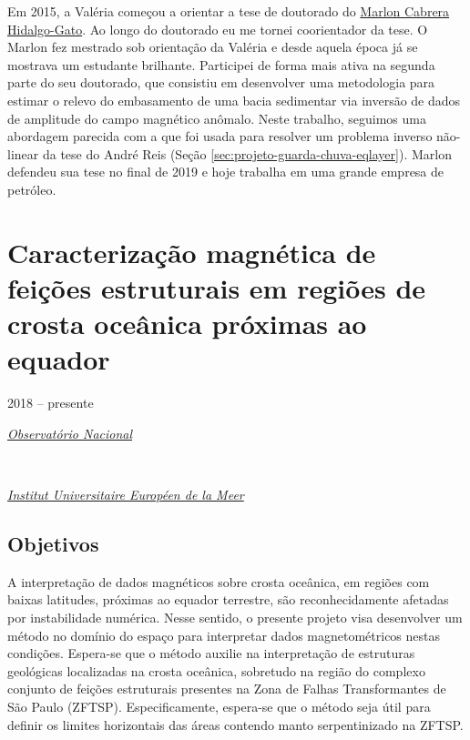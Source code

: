 \bigskip

\noindent Em 2015, a Valéria começou a orientar a tese de doutorado do
\href{https://lattes.cnpq.br/4057248251995225}{Marlon Cabrera Hidalgo-Gato}.
Ao longo do doutorado eu me tornei coorientador da tese.
O Marlon fez mestrado sob orientação da Valéria e desde aquela época já se
mostrava um estudante brilhante. Participei de forma mais ativa na segunda parte do
seu doutorado, que consistiu em desenvolver uma metodologia para estimar o 
relevo do embasamento de uma bacia sedimentar via inversão de dados de amplitude
do campo magnético anômalo. Neste trabalho, seguimos uma abordagem parecida com a
que foi usada para resolver um problema inverso não-linear da tese do André Reis
(Seção \ref{sec:projeto-guarda-chuva-eqlayer}). Marlon defendeu sua tese no final 
de 2019 e hoje trabalha em uma grande empresa de petróleo.

\section{Caracterização magnética de feições estruturais em regiões de crosta oceânica próximas ao equador} 
\label{sec:projeto-baixas-latitudes}

2018 -- presente
\vspace{0.3\baselineskip}\\
\noindent\parbox{0.03\textwidth}{\vspace{-0.2\baselineskip}\faUniversity} \href{https://www.gov.br/observatorio/pt-br}{\textsl{Observatório Nacional}}
\parbox{0.03\textwidth}{\vspace{-0.2\baselineskip} \hfill {}} \\
\noindent\parbox{0.03\textwidth}{\vspace{-0.2\baselineskip}\faUniversity}
\href{https://www-iuem.univ-brest.fr/}{\textsl{Institut Universitaire Européen de la Meer}}
\parbox{0.03\textwidth}{\vspace{-0.2\baselineskip} \hfill {}}

\subsection*{Objetivos}

A interpretação de dados magnéticos sobre crosta oceânica, em regiões com baixas latitudes,
próximas ao equador terrestre, são reconhecidamente afetadas por instabilidade numérica.
Nesse sentido, o presente projeto visa desenvolver um método no domínio do espaço 
para interpretar dados magnetométricos nestas condições. 
Espera-se que o método auxilie na interpretação de estruturas geológicas localizadas na
crosta oceânica, sobretudo na região do complexo conjunto de feições estruturais presentes
na Zona de Falhas Transformantes de São Paulo (ZFTSP). Especificamente, espera-se que o
método seja útil para definir os limites horizontais das áreas
contendo manto serpentinizado na ZFTSP.

